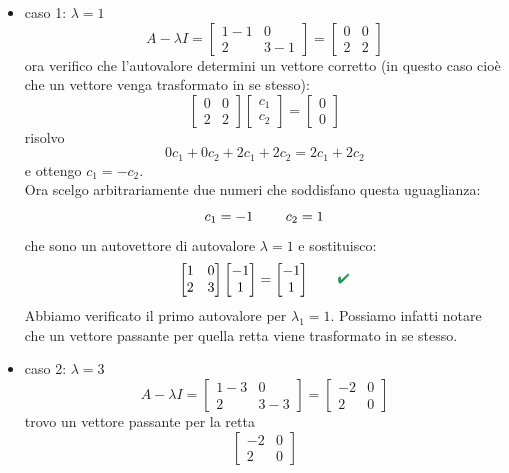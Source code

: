 \documentclass[italian]{article}
\renewcommand{\checkmark}{\textcolor{ForestGreen}{\text{$\qquad$\ding{52}}}}
\begin{document}
\begin{itemize}
	\item caso 1: $\lambda=1$
		\[
			A - \lambda I =
			\begin{bmatrix}1-1 & 0 \\ 2 & 3-1\end{bmatrix}
			=
			\begin{bmatrix}0 & 0 \\ 2 & 2\end{bmatrix}
		\]
		ora verifico che l'autovalore determini un vettore corretto (in questo caso cioè che un vettore venga trasformato in se stesso):
		\[
			\begin{bmatrix}0 & 0 \\ 2 & 2\end{bmatrix}
			\begin{bmatrix}c_1\\c_2\end{bmatrix}
			=
			\begin{bmatrix}0\\0\end{bmatrix}
		\]
		risolvo
		\[
			0c_1 + 0c_2 + 2c_1 + 2c_2 = 2c_1 + 2c_2
		\]
		e ottengo $c_1 = -c_2$. \\[2mm]Ora scelgo arbitrariamente due numeri che soddisfano questa uguaglianza: \[c_1 = -1$ \qquad $c_2=1\] che sono un autovettore di autovalore $\lambda = 1$ e sostituisco:
		\[
			\begin{bmatrix}1 & 0 \\ 2 & 3\end{bmatrix}
			\begin{bmatrix}-1\\1\end{bmatrix}
			=
			\begin{bmatrix}-1\\1\end{bmatrix} \checkmark
		\]
		Abbiamo verificato il primo autovalore per $\lambda_1 = 1$. Possiamo infatti notare che un vettore passante per quella retta viene trasformato in se stesso.
	\item caso 2: $\lambda = 3$
		\[
			A - \lambda I =
			\begin{bmatrix}1-3 & 0 \\ 2 & 3-3\end{bmatrix}
			=
			\begin{bmatrix}-2 & 0 \\ 2 & 0\end{bmatrix}
		\]
		trovo un vettore passante per la retta
		\[
			\begin{bmatrix}-2 & 0 \\ 2 & 0\end{bmatrix}
\]
\end{itemize}
\end{document}
